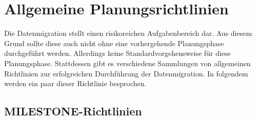 \section{Allgemeine Planungsrichtlinien}
\label{chapter:richtlinien}

Die Datenmigration stellt einen risikoreichen Aufgabenbereich dar. Aus diesem Grund sollte diese auch nicht ohne eine vorhergehende Planungsphase durchgeführt werden. Allerdings keine Standardvorgehensweise für diese Planungsphase.\cite[S. 3]{wuLawless-1997} Stattdessen gibt es verschiedene Sammlungen von allgemeinen Richtlinien zur erfolgreichen Durchführung der Datenmigration. In folgendem werden ein paar dieser Richtlinie besprochen.

\subsection{MILESTONE-Richtlinien}



